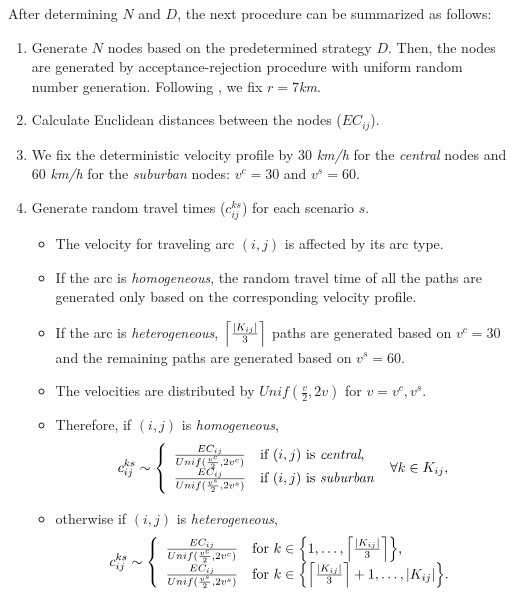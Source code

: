 After determining $N$ and $D$, the next procedure can be summarized as follows:
\begin{enumerate}
	\item Generate $N$ nodes based on the predetermined strategy $D$. Then, the nodes are generated by acceptance-rejection procedure with uniform random number generation. Following \cite{journal:TPP2017}, we fix $r=7$\textit{km}. 
	\item Calculate Euclidean distances between the nodes ($EC_{ij}$).
	\item We fix the deterministic velocity profile by 30 \textit{km/h} for the \textit{central} nodes and 60 \textit{km/h} for the \textit{suburban} nodes: $v^c=30$ and $v^s=60$.
	\item Generate random travel times ($c_{ij}^{ks}$) for each scenario $s$.
	\begin{itemize}
		\item The velocity for traveling arc $(i,j)$ is affected by its arc type.
		\item If the arc is \textit{homogeneous}, the random travel time of all the paths are generated only based on the corresponding velocity profile.
		\item If the arc is \textit{heterogeneous}, $\ceil*{\frac{|K_{ij}|}{3}}$ paths are generated based on $v^c=30$ and the remaining paths are generated based on $v^s=60$. 
		\item The velocities are distributed by $Unif(\frac{v}{2},2v)$ for $v=v^c,v^s$.
		\item Therefore, if $(i,j)$ is \textit{homogeneous}, 
		\begin{align*}
		c_{ij}^{ks}\sim\left\{ \begin{array}{ll} \frac{EC_{ij}}{Unif(\frac{v^c}{2},2v^c)} & \textrm{if $(i,j)$ is \textit{central},} \\
		\frac{EC_{ij}}{Unif(\frac{v^s}{2},2v^s)} & \textrm{if $(i,j)$ is \textit{suburban}}	\end{array} \right.\ \forall k\in K_{ij},
		\end{align*}
		\item otherwise if $(i,j)$ is \textit{heterogeneous},
		\begin{align*}
		c_{ij}^{ks}\sim\left\{ \begin{array}{ll} \frac{EC_{ij}}{Unif(\frac{v^c}{2},2v^c)} & \textrm{for $k\in\left\{1,\ldots,\ceil*{\frac{|K_{ij}|}{3}}\right\}$,} \\
		\frac{EC_{ij}}{Unif(\frac{v^s}{2},2v^s)} & \textrm{for $k\in\left\{\ceil*{\frac{|K_{ij}|}{3}}+1,\ldots,|K_{ij}|\right\}$.}	\end{array} \right.
		\end{align*}
	\end{itemize}
\end{enumerate}
